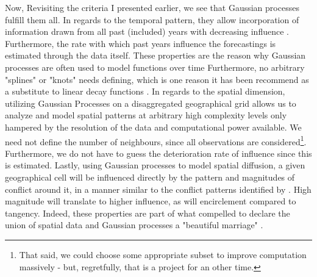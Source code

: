 \documentclass[a4paper]{article}
\begin{document}


Now, Revisiting the criteria I presented earlier, we see that Gaussian processes fulfill them all. In regards to the temporal pattern, they allow incorporation of information drawn from all past (included) years with decreasing influence \citep[410-419]{Mcelreath_2018}. Furthermore, the rate with which past years influence the forecastings is estimated through the data itself. These properties are the reason why Gaussian processes are often used to model functions over time \citep[13]{williams2006gaussian} Furthermore, no arbitrary "splines" or "knots" needs defining, which is one reason it has been recommend as a substitute to linear decay functions \cite[501]{Gelman_2013}. In regards to the spatial dimension, utilizing Gaussian Processes on a disaggregated geographical grid allows us to analyze and model spatial patterns at arbitrary high complexity levels only hampered by the resolution of the data and computational power available. We need not define the number of neighbours, since all observations are considered\footnote{That said, we could choose some appropriate subset to improve computation massively \citep{gelfand2016spatial} - but, regretfully, that is a project for an other time.}. Furthermore, we do not have to guess the deterioration rate of influence since this is estimated. Lastly, using Gaussian processes to model spatial diffusion, a given geographical cell will be influenced directly by the pattern and magnitudes of conflict around it, in a manner similar to the conflict patterns identified by \cite{schutte2011diffusion}. High magnitude will translate to higher influence, as will encirclement compared to tangency. Indeed, these properties are part of what compelled \cite{gelfand2016spatial} to declare the union of spatial data and Gaussian processes a "beautiful marriage" \citep[86]{gelfand2016spatial}.
\end{document}
